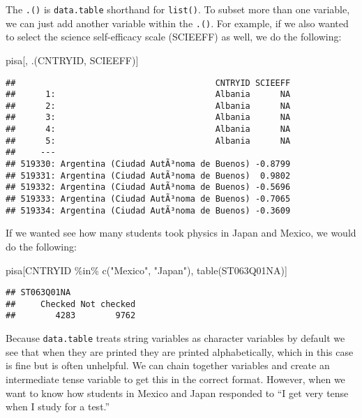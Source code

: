 \documentclass[
]{book}
\newenvironment{Shaded}{\begin{snugshade}}{\end{snugshade}}
\newcommand{\FunctionTok}[1]{\textcolor[rgb]{0.00,0.00,0.00}{#1}}
\newcommand{\NormalTok}[1]{#1}
\newcommand{\SpecialCharTok}[1]{\textcolor[rgb]{0.00,0.00,0.00}{#1}}
\newcommand{\StringTok}[1]{\textcolor[rgb]{0.31,0.60,0.02}{#1}}
\begin{document}
The \texttt{.()} is \texttt{data.table} shorthand for \texttt{list()}. To subset more than one variable, we can just add another variable within the \texttt{.()}. For example, if we also wanted to select the science self-efficacy scale (SCIEEFF) as well, we do the following:

\begin{Shaded}
\begin{Highlighting}[]
\NormalTok{pisa[,}
\NormalTok{     .(CNTRYID, SCIEEFF)]}
\end{Highlighting}
\end{Shaded}

\begin{verbatim}
##                                        CNTRYID SCIEEFF
##      1:                                Albania      NA
##      2:                                Albania      NA
##      3:                                Albania      NA
##      4:                                Albania      NA
##      5:                                Albania      NA
##     ---                                               
## 519330: Argentina (Ciudad AutÃ³noma de Buenos) -0.8799
## 519331: Argentina (Ciudad AutÃ³noma de Buenos)  0.9802
## 519332: Argentina (Ciudad AutÃ³noma de Buenos) -0.5696
## 519333: Argentina (Ciudad AutÃ³noma de Buenos) -0.7065
## 519334: Argentina (Ciudad AutÃ³noma de Buenos) -0.3609
\end{verbatim}

If we wanted see how many students took physics in Japan and Mexico, we would do the following:

\begin{Shaded}
\begin{Highlighting}[]
\NormalTok{pisa[CNTRYID }\SpecialCharTok{\%in\%} \FunctionTok{c}\NormalTok{(}\StringTok{"Mexico"}\NormalTok{, }\StringTok{"Japan"}\NormalTok{),}
     \FunctionTok{table}\NormalTok{(ST063Q01NA)]}
\end{Highlighting}
\end{Shaded}

\begin{verbatim}
## ST063Q01NA
##     Checked Not checked 
##        4283        9762
\end{verbatim}

Because \texttt{data.table} treats string variables as character variables by default we see that when they are printed they are printed alphabetically, which in this case is fine but is often unhelpful. We can chain together variables and create an intermediate tense variable to get this in the correct format. However, when we want to know how students in Mexico and Japan responded to ``I get very tense when I study for a test.''
\end{document}
